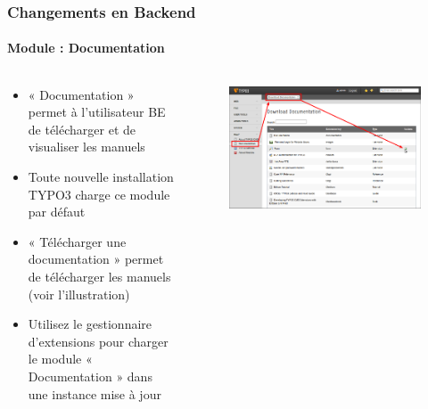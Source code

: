 \begin{frame}[fragile]
	\frametitle{Changements en Backend}
	\framesubtitle{Module : Documentation}

	\begin{columns}[T]

		\begin{column}{.5\textwidth}
			\begin{itemize}
				\item « Documentation » permet à l'utilisateur BE de télécharger et de visualiser les manuels
				\item Toute nouvelle installation TYPO3 charge ce module par défaut
				\item « Télécharger une documentation » permet de télécharger les manuels (voir l'illustration)
				\item Utilisez le gestionnaire d'extensions pour charger le module « Documentation » dans une instance mise à jour
			\end{itemize}
		\end{column}

		\begin{column}{.5\textwidth}
			\begin{figure}\vspace*{-0.4cm}
				\includegraphics[width=1\linewidth]{Images/BackendChanges/DownloadDocumentation.png}
			\end{figure}
		\end{column}

	\end{columns}

\end{frame}


